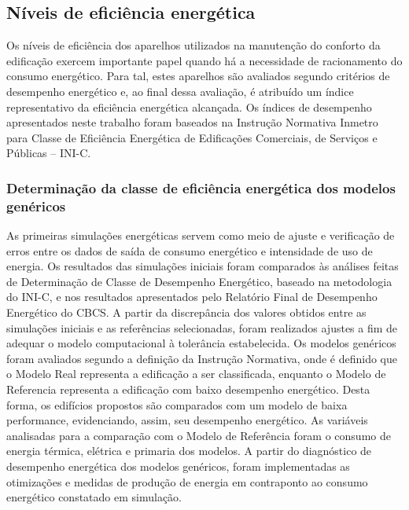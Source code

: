 \subsection{Níveis de eficiência energética}
Os níveis de eficiência dos aparelhos utilizados na manutenção do conforto da edificação 
exercem importante papel quando há a necessidade de racionamento do consumo energético. 
Para tal, estes aparelhos são avaliados segundo critérios de desempenho energético e, ao 
final dessa avaliação, é atribuído um índice representativo da eficiência energética 
alcançada. Os índices de desempenho apresentados neste trabalho foram baseados na 
Instrução Normativa Inmetro para Classe de Eficiência Energética de Edificações Comerciais, 
de Serviços e Públicas – INI-C.
\subsubsection{Determinação da classe de eficiência energética dos modelos genéricos}
As primeiras simulações energéticas servem como meio de ajuste e verificação de erros 
entre os dados de saída de consumo energético e intensidade de uso de energia. Os 
resultados das simulações iniciais foram comparados às análises feitas de Determinação 
de Classe de Desempenho Energético, baseado na metodologia do INI-C, e nos resultados 
apresentados pelo Relatório Final de Desempenho Energético do CBCS. A partir da 
discrepância dos valores obtidos entre as simulações iniciais e as referências 
selecionadas, foram realizados ajustes a fim de adequar o modelo computacional à 
tolerância estabelecida.\vspace*{0.3cm} \newline
Os modelos genéricos foram avaliados segundo a definição da Instrução Normativa, onde 
é definido que o Modelo Real representa a edificação a ser classificada, enquanto 
o Modelo de Referencia representa a edificação com baixo desempenho energético. 
Desta forma, os edifícios propostos são comparados com um modelo de baixa performance, 
evidenciando, assim, seu desempenho energético. As variáveis analisadas para a 
comparação com o Modelo de Referência foram o consumo de energia térmica, elétrica 
e primaria dos modelos.\vspace*{0.3cm} \newline
A partir do diagnóstico de desempenho energética dos modelos genéricos, foram 
implementadas as otimizações e medidas de produção de energia em contraponto ao 
consumo energético constatado em simulação.
